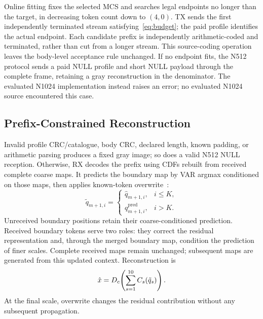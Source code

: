 Online fitting fixes the selected MCS and searches legal endpoints no longer than the target, in decreasing token count down to $(4,0)$. TX sends the first independently terminated stream satisfying~\eqref{eq:budget}; the paid profile identifies the actual endpoint. Each candidate prefix is independently arithmetic-coded and terminated, rather than cut from a longer stream. This source-coding operation leaves the body-level acceptance rule unchanged. If no endpoint fits, the N512 protocol sends a paid NULL profile and short NULL payload through the complete frame, retaining a gray reconstruction in the denominator. The evaluated N1024 implementation instead raises an error; no evaluated N1024 source encountered this case.

\ifCLASSOPTIONonecolumn\else\fi
\subsection{Prefix-Constrained Reconstruction}
Invalid profile CRC/catalogue, body CRC, declared length, known padding, or arithmetic parsing produces a fixed gray image; so does a valid N512 NULL reception. Otherwise, RX decodes the prefix using CDFs rebuilt from received complete coarse maps. It predicts the boundary map by VAR argmax conditioned on those maps, then applies known-token overwrite~\cite{var}:
\begin{equation}
 \tilde q_{m+1,i}=\begin{cases}\hat q_{m+1,i},&i\leq K,\\q^{\mathrm{pred}}_{m+1,i},&i>K.\end{cases}
 \label{eq:overwrite}
\end{equation}
Unreceived boundary positions retain their coarse-conditioned prediction. Received boundary tokens serve two roles: they correct the residual representation and, through the merged boundary map, condition the prediction of finer scales. Complete received maps remain unchanged; subsequent maps are generated from this updated context. Reconstruction is
\begin{equation}
 \hat x=D_c\!\left(\sum_{s=1}^{10}C_s(\tilde q_s)\right).
 \label{eq:reconstruction}
\end{equation}
At the final scale, overwrite changes the residual contribution without any subsequent propagation.
